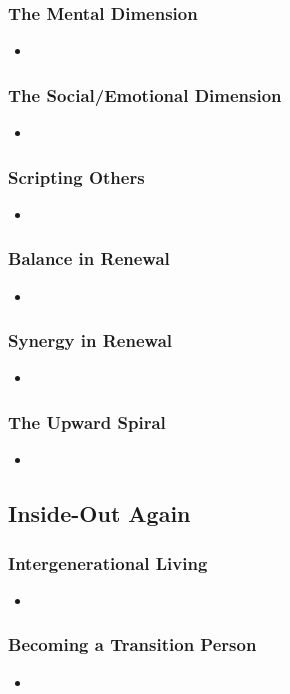 \documentclass[11pt]{article}
\begin{document}
\subsubsection{The Mental Dimension}
\begin{itemize}
\item 
\end{itemize}
\subsubsection{The Social/Emotional Dimension}
\begin{itemize}
\item 
\end{itemize}
\subsubsection{Scripting Others}
\begin{itemize}
\item 
\end{itemize}
\subsubsection{Balance in Renewal}
\begin{itemize}
\item 
\end{itemize}
\subsubsection{Synergy in Renewal}
\begin{itemize}
\item 
\end{itemize}
\subsubsection{The Upward Spiral}
\begin{itemize}
\item 
\end{itemize}
\subsection{Inside-Out Again}
\subsubsection{Intergenerational Living}
\begin{itemize}
\item 
\end{itemize}
\subsubsection{Becoming a Transition Person}
\begin{itemize}
\item 
\end{itemize}
\newpage


\end{document}

